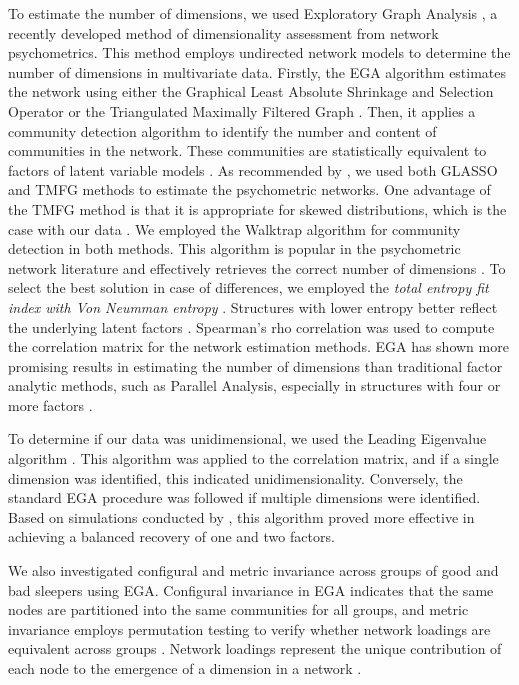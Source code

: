 \documentclass[
  12pt,
  twoside,
  openright,
  a4paper,
  chapter=TITLE,
  section=TITLE,
  brazil]{abntex2}
\begin{document}
To estimate the number of dimensions, we used Exploratory Graph Analysis
\autocites[EGA,][]{golino2017,golino2020}, a recently developed method
of dimensionality assessment from network psychometrics. This method
employs undirected network models to determine the number of dimensions
in multivariate data. Firstly, the EGA algorithm estimates the network
using either the Graphical Least Absolute Shrinkage and Selection
Operator \autocites[GLASSO,][]{R-glasso,friedman2008} or the
Triangulated Maximally Filtered Graph \autocite[TMFG,][]{massara2016}.
Then, it applies a community detection algorithm to identify the number
and content of communities in the network. These communities are
statistically equivalent to factors of latent variable models
\autocite{golino2017}. As recommended by \textcite{golino2020}, we used
both GLASSO and TMFG methods to estimate the psychometric networks. One
advantage of the TMFG method is that it is appropriate for skewed
distributions, which is the case with our data
\autocite{christensen2018,christensen2023a}. We employed the Walktrap
algorithm for community detection in both methods. This algorithm is
popular in the psychometric network literature and effectively retrieves
the correct number of dimensions \autocite{golino2020,christensen2023a}.
To select the best solution in case of differences, we employed the
\emph{total entropy fit index with Von Neumman entropy}
\autocite[TEFI.vn,][]{golino2021a}. Structures with lower entropy better
reflect the underlying latent factors \autocite{golino2021a}. Spearman's
rho correlation was used to compute the correlation matrix for the
network estimation methods. EGA has shown more promising results in
estimating the number of dimensions than traditional factor analytic
methods, such as Parallel Analysis, especially in structures with four
or more factors \autocite{golino2020}.

To determine if our data was unidimensional, we used the Leading
Eigenvalue algorithm \autocite{newman2006}. This algorithm was applied
to the correlation matrix, and if a single dimension was identified,
this indicated unidimensionality. Conversely, the standard EGA procedure
was followed if multiple dimensions were identified. Based on
simulations conducted by \textcite{christensen2023a}, this algorithm
proved more effective in achieving a balanced recovery of one and two
factors.

We also investigated configural and metric invariance across groups of
good and bad sleepers using EGA. Configural invariance in EGA indicates
that the same nodes are partitioned into the same communities for all
groups, and metric invariance employs permutation testing to verify
whether network loadings are equivalent across groups
\autocite{jamison2022}. Network loadings represent the unique
contribution of each node to the emergence of a dimension in a network
\autocite{christensen2021}.
\end{document}
